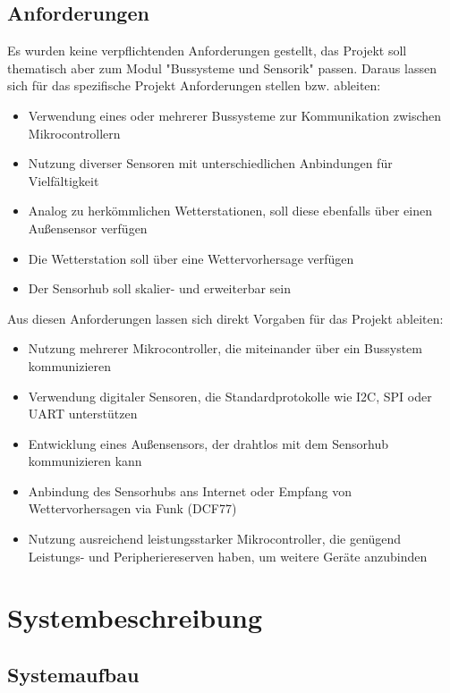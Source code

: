\documentclass[a4paper,11pt]{article}
\begin{document}
\subsection{Anforderungen}
\label{subsub:anforderungen}

Es wurden keine verpflichtenden Anforderungen gestellt, das Projekt soll thematisch aber zum Modul
"Bussysteme und Sensorik" passen. Daraus lassen sich für das spezifische Projekt Anforderungen stellen bzw. ableiten:

\begin{itemize}
  \item Verwendung eines oder mehrerer Bussysteme zur Kommunikation zwischen Mikrocontrollern
  \item Nutzung diverser Sensoren mit unterschiedlichen Anbindungen für Vielfältigkeit
  \item Analog zu herkömmlichen Wetterstationen, soll diese ebenfalls über einen Außensensor verfügen
  \item Die Wetterstation soll über eine Wettervorhersage verfügen
  \item Der Sensorhub soll skalier- und erweiterbar sein
\end{itemize}

\noindent
Aus diesen Anforderungen lassen sich direkt Vorgaben für das Projekt ableiten:
\begin{itemize}
  \item Nutzung mehrerer Mikrocontroller, die miteinander über ein Bussystem kommunizieren
  \item Verwendung digitaler Sensoren, die Standardprotokolle wie I2C, SPI oder UART unterstützen
  \item Entwicklung eines Außensensors, der drahtlos mit dem Sensorhub kommunizieren kann
  \item Anbindung des Sensorhubs ans Internet oder Empfang von Wettervorhersagen via Funk (DCF77)
  \item Nutzung ausreichend leistungsstarker Mikrocontroller, die genügend Leistungs- und Peripheriereserven haben, um weitere Geräte anzubinden
\end{itemize}

\section{Systembeschreibung}
\label{sub:systembeschreibung}

\subsection{Systemaufbau}
\label{subsub:systemaufbau}
\end{document}
